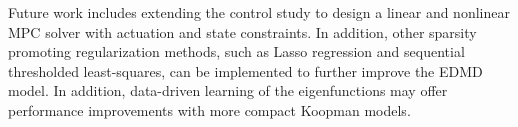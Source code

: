 \documentclass[letterpaper, 10 pt, conference]{ieeeconf}  %
\begin{document}
Future work includes extending the control study to design a linear and nonlinear MPC solver with actuation and state constraints. In addition, other sparsity promoting regularization methods, such as Lasso regression and sequential thresholded least-squares, can be implemented to further improve the EDMD model. In addition, data-driven learning of the eigenfunctions may offer performance improvements with more compact Koopman models.

\addtolength{\textheight}{-12cm}   %
\end{document}
